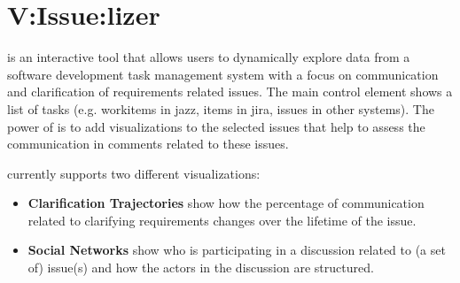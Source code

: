 \section{V:Issue:lizer}

\viss is an interactive tool that allows users to dynamically explore data from a software development task management system with a focus on communication and clarification of requirements related issues.
The main control element shows a list of tasks (e.g. workitems in jazz, items in jira, issues in other systems).
The power of \viss is to add visualizations to the selected issues that help to assess the communication in comments related to these issues.

\viss currently supports two different visualizations: 
\begin{itemize}
\item \textbf{Clarification Trajectories} show how the percentage of communication related to clarifying requirements changes over the lifetime of the issue.
\item \textbf{Social Networks} show who is participating in a discussion related to (a set of) issue(s) and how the actors in the discussion are structured. 
\end{itemize} 